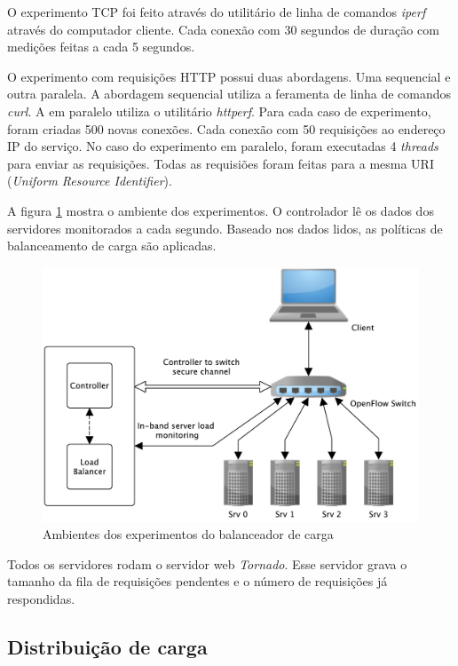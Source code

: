 O experimento TCP foi feito através do utilitário de linha de comandos 
\emph{iperf} através do computador cliente.
Cada conexão com 30 segundos de duração com medições feitas a cada 5 segundos.

O experimento com requisições HTTP possui duas abordagens.
Uma sequencial e outra paralela.
A abordagem sequencial utiliza a feramenta de linha de comandos \emph{curl}.
A em paralelo utiliza o utilitário \emph{httperf}.
Para cada caso de experimento, foram criadas 500 novas conexões.
Cada conexão com 50 requisições ao endereço IP do serviço.
No caso do experimento em paralelo, foram executadas 4 \emph{threads} para 
enviar as requisições.
Todas as requisiões foram feitas para a mesma URI (\emph{Uniform Resource
Identifier}).

A figura \ref{fig:testbed} mostra o ambiente dos experimentos.
O controlador lê os dados dos servidores monitorados a cada segundo.
Baseado nos dados lidos, as políticas de balanceamento de carga são aplicadas.

\begin{figure}[htb!]
    \centering
    \includegraphics[scale=1.05]{img/balancer-testbed-img}
    \caption{Ambientes dos experimentos do balanceador de carga}
    \label{fig:testbed}
\end{figure}

Todos os servidores rodam o servidor web \emph{Tornado}\citep{tornado}. 
Esse servidor grava o tamanho da fila de requisições pendentes e o número de 
requisições já respondidas.


\subsection{Distribuição de carga}

